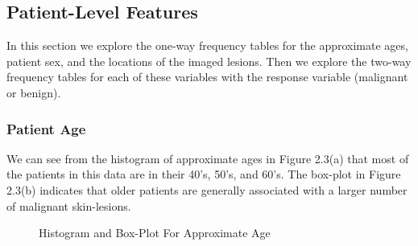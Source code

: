 \documentclass [MAS] {uclathes}
\begin{document}
\subsection{Patient-Level Features}

In this section we explore the one-way frequency tables for the approximate ages, patient sex, and the locations of the imaged lesions. Then we explore the two-way frequency tables for each of these variables with the response variable (malignant or benign).

\subsubsection*{Patient Age}

We can see from the histogram of approximate ages in Figure 2.3(a) that most of the patients in this data are in their 40's, 50's, and 60's. The box-plot in Figure 2.3(b) indicates that older patients are generally associated with a larger number of malignant skin-lesions.

\begin{figure}[hbt!]
\hspace*{\fill}
\centering
{}\hspace{0.5em}
\hspace*{\fill}
\label{fig:age_eda}
\vspace{0cm}
\caption{Histogram and Box-Plot For Approximate Age}
\end{figure}
\end{document}
